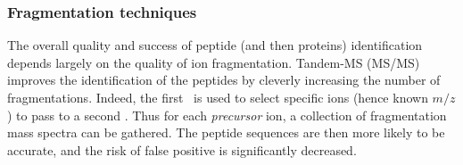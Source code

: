 \begin{comment}
Compared with other traps, linear ion traps provide an enhanced dynamic range
with a reduced low mass cut-off as the ion cloud is
spatially distributed on a linear axis and not a 3D centre which improves the
sensitivity. And then, for example, the ions may then be accumulated before
being released into another mass analyser~\mycite{Madalinski2008}.

\minisec{\orbi}
It is a very recent analyser and it relies on \gls{FT}. Recently,
there is increasing use of \glspl{FTMS} for proteomic studies. Indeed, these
\glspl{FTMS} are more precise than previous analysers and allow the detection of
a greater range of ions in very short lapses of time~\mycite{Scigelova2011}.
In this kind of analyser, ions are trapped and both orbit around and oscillate
in an electrostatic field between an inner and outer part of a central electrode
shaped as a spindle.
The ions can only move following the spindle long axis~\mycite{Makarov2000}.
While moving around the spindle the ions create a current.
The outer part of the spindle records images of this current.
Fourier transformation of these images allows obtaining very highly accurate
and sensitive mass spectra for a greater dynamic range than most of the
other analysers.~\mycite{Hu2005}

\minisec{\gls{LTQ}-\orbi}
It is a hybrid (tandem) mass spectrometer that uses \gls{ESI} for the ionisation
step and has an \gls{LTQ} as a first analyser (MS$^1$)
and an \orbi\ as a second one (MS$^2$).
This \gls{MS/MS} enables multiple levels of
fragmentation for the elucidation of a wide range of peptides and can be coupled
with an \gls{ESI} which is a continuous source of ionisation. This instrument
allows analysing proteomic samples optimally both in terms of starting material,
time~\mycite{Scigelova2011} and provides \enquote{ultrahigh} mass resolution,
high mass accuracy
and enhanced dynamic range with respect to mass accuracy~\mycite{Madalinski2008}.
\end{comment}

\subsubsection{Fragmentation techniques~}

The overall quality and success of peptide (and then proteins)
identification depends largely on the quality of ion fragmentation.
Tandem-\gls{MS} (\gls{MS/MS}) improves the identification of the peptides
by cleverly increasing the number of fragmentations.
Indeed, the first \ms\ is
used to select specific ions (hence known $m/z$) to pass to a second \ms.
Thus for each \emph{precursor} ion, a collection of fragmentation mass spectra
can be gathered. The peptide sequences are then more likely to be accurate, and
the risk of false positive is significantly decreased.

